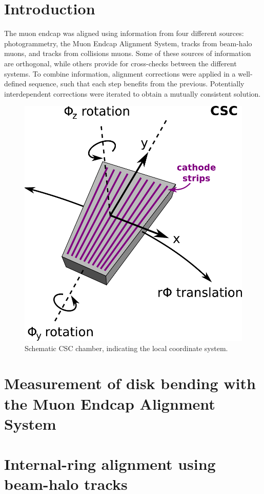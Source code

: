 \documentclass[12pt]{article}
\begin{document}
\section{Introduction}

The muon endcap was aligned using information from four different
sources: photogrammetry, the Muon Endcap Alignment System, tracks from
beam-halo muons, and tracks from collisions muons.  Some of these
sources of information are orthogonal, while others provide for
cross-checks between the different systems.  To combine information,
alignment corrections were applied in a well-defined sequence, such
that each step benefits from the previous.  Potentially interdependent
corrections were iterated to obtain a mutually consistent solution.

\begin{figure}
\begin{center}
\includegraphics[width=0.3\linewidth]{csc_coordinates.pdf}

\caption{Schematic CSC chamber, indicating the local coordinate
  system. \label{fig:csc_coordinates}}
\end{center}

\end{figure}

\section{Measurement of disk bending with the Muon Endcap Alignment System}

\section{Internal-ring alignment using beam-halo tracks}
\end{document}
